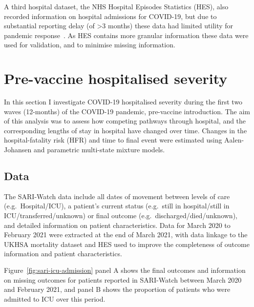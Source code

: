A third hospital dataset, the NHS Hospital Episodes Statistics (HES), also recorded information on hospital admissions for COVID-19, but due to substantial reporting delay (of >3 months) these data had limited utility for pandemic response~\parencite{NHS_Digital2020-jn}. As HES contains more granular information these data were used for validation, and to minimise missing information.

\section{Pre-vaccine hospitalised severity}

In this section I investigate COVID-19 hospitalised severity during the first two waves (12-months) of the COVID-19 pandemic, pre-vaccine introduction. The aim of this analysis was to assess how competing pathways through hospital, and the corresponding lengths of stay in hospital have changed over time. Changes in the hospital-fatality risk (HFR) and time to final event were estimated using Aalen-Johansen and parametric multi-state mixture models.

\subsection{Data}

The SARI-Watch data include all dates of movement between levels of care (e.g.\ Hospital/ICU), a patient's current status (e.g.\ still in hospital/still in ICU/transferred/unknown) or final outcome (e.g.\ discharged/died/unknown), and detailed information on patient characteristics. Data for March 2020 to February 2021 were extracted at the end of March 2021, with data linkage to the UKHSA mortality dataset and HES used to improve the completeness of outcome information and patient characteristics.

Figure~\ref{fig:sari-icu-admission} panel A shows the final outcomes and information on missing outcomes for patients reported in SARI-Watch between March 2020 and February 2021, and panel B shows the proportion of patients who were admitted to ICU over this period.

